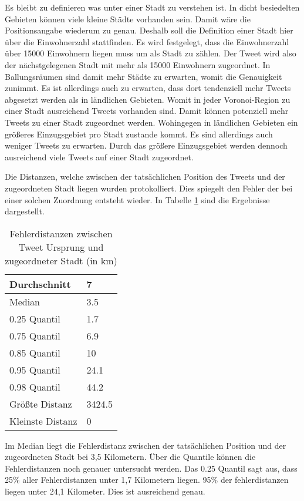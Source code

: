 			Es bleibt zu definieren was unter einer Stadt zu verstehen ist.
			In dicht besiedelten Gebieten können viele kleine Städte vorhanden sein. 
			Damit wäre die Positionsangabe wiederum zu genau.
			Deshalb soll die Definition einer Stadt hier über die Einwohnerzahl stattfinden.
			Es wird festgelegt, dass die Einwohnerzahl über 15000 Einwohnern liegen muss um als Stadt zu zählen. 
			Der Tweet wird also der nächstgelegenen Stadt mit mehr als 15000 Einwohnern zugeordnet.
			In Ballungsräumen sind damit mehr Städte zu erwarten, womit die Genauigkeit zunimmt.
			Es ist allerdings auch zu erwarten, dass dort tendenziell mehr Tweets abgesetzt werden als in ländlichen Gebieten.
			Womit in jeder Voronoi-Region zu einer Stadt ausreichend Tweets vorhanden sind.
			Damit können potenziell mehr Tweets zu einer Stadt zugeordnet werden.
			Wohingegen in ländlichen Gebieten ein größeres Einzugsgebiet pro Stadt zustande kommt.
			Es sind allerdings auch weniger Tweets zu erwarten. 
			Durch das größere Einzugsgebiet werden dennoch ausreichend viele Tweets auf einer Stadt zugeordnet. 

			Die Distanzen, welche zwischen der tatsächlichen Position des Tweets und der zugeordneten Stadt liegen wurden protokolliert. 
			Dies spiegelt den Fehler der bei einer solchen Zuordnung entsteht wieder.
			In Tabelle \ref{tab:distances} sind die Ergebnisse dargestellt.

			\begin{table}[h]
			\centering
			\caption{Fehlerdistanzen zwischen Tweet Ursprung und zugeordneter Stadt (in km)}
			\label{tab:distances}
			\begin{tabular}{|l|l|}
			Durchschnitt & 7      \\ \hline
			Median       & 3.5    \\ \hline
			0.25 Quantil & 1.7    \\ \hline
			0.75 Quantil & 6.9    \\ \hline
			0.85 Quantil & 10     \\ \hline
			0.95 Quantil & 24.1   \\ \hline
			0.98 Quantil & 44.2   \\ \hline
			Größte Distanz      & 3424.5 \\ \hline
			Kleinste Distanz     & 0     
			\end{tabular}
			\end{table}

			Im Median liegt die Fehlerdistanz zwischen der tatsächlichen Position und der zugeordneten Stadt bei 3,5 Kilometern.
			Über die Quantile können die Fehlerdistanzen noch genauer untersucht werden.
			Das 0.25 Quantil sagt aus, dass 25\% aller Fehlerdistanzen unter 1,7 Kilometern liegen.
			95\% der fehlerdistanzen liegen unter 24,1 Kilometer. 
			Dies ist ausreichend genau. 

